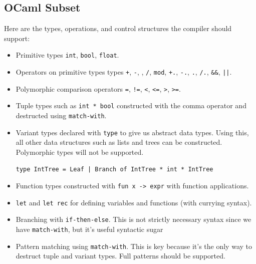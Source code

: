 \documentclass[12pt,a4paper,twoside,openright]{report}
\begin{document}
\subsection{OCaml Subset}
Here are the types, operations, and control structures the compiler should support:
\begin{itemize}
   \item
      Primitive types {\tt int}, {\tt bool}, {\tt float}.
   \item
      Operators on primitive types types {\tt +}, {\tt -}, {\tt *}, {\tt /}, {\tt mod}, {\tt +.}, {\tt -.}, {\tt *.}, {\tt /.}, {\tt \&\&}, {\tt ||}.
   \item
      Polymorphic comparison operators {\tt =}, {\tt !=}, {\tt <}, {\tt <=}, {\tt >}, {\tt >=}.
   \item
      Tuple types such as {\tt int * bool} constructed with the comma operator and destructed using {\tt match-with}.
   \item
      Variant types declared with {\tt type} to give us abstract data types. Using this, all other data structures such as lists and trees can be constructed. Polymorphic types will not be supported.
      \begin{verbatim}
type IntTree = Leaf | Branch of IntTree * int * IntTree \end{verbatim}
   \item
      Function types constructed with {\tt fun x -> expr} with function applications.
   \item
      {\tt let} and {\tt let rec} for defining variables and functions (with currying syntax).
   \item
      Branching with {\tt if-then-else}. This is not strictly necessary syntax since we have {\tt match-with}, but it's useful syntactic sugar
   \item
      Pattern matching using {\tt match-with}. This is key because it's the only way to destruct tuple and variant types. Full patterns should be supported.

\end{itemize}
\end{document}
